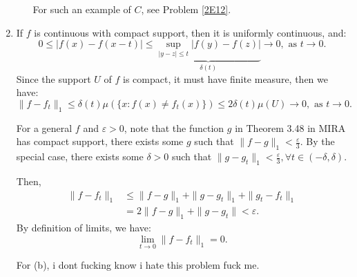 \begin{enumerate}[label=\textbf{3B.\arabic*}]
\begin{enumerate}[label=(\alph*)]
  For such an example of \( C \), see Problem \ref{2E12}.
\end{enumerate}
\item 
  If \( f \) is continuous with compact support, then it is uniformly
  continuous, and:
  \[
    0 \le |f(x)-f(x-t)| \le \underbrace{\sup _{|y-z| \le t}
    |f(y)-f(z)|}_{\delta(t)} \to 0, \text{ as } t \to 0
  .\] 
  Since the support \( U \) of \( f \) is compact, it must have finite measure,
  then we have:
  \[
    \|f-f_{t}\|_{1} \le \delta(t)\mu(\{x: f(x) \neq f_{t}(x)\}  ) \le
    2\delta(t)\mu (U) \to 0, \text{ as } t\to 0
  .\] 

  For a general \( f \) and \( \varepsilon > 0 \), note that the function \( g
  \) in Theorem 3.48 in MIRA has compact support, there exists some \( g \) such
  that \( \|f-g\|_{1} < \frac{\varepsilon}{3} \). By the special case, there
  exists some \( \delta > 0 \) such that \( \|g - g_{t}\|_{1} <
  \frac{\varepsilon}{3}, \forall t \in (-\delta, \delta) \).

  Then,
  \begin{align*}
    \|f-f_{t}\|_{1} &\le \|f - g\|_{1} + \|g -
    g_{t}\|_{1} + \|g_{t}-f_{t}\|_{1}\\
    &= 2\|f-g\|_{1} + \|g-g_{t}\| < \varepsilon
  .\end{align*}
  By definition of limits, we have:
  \[
    \lim_{t \to  0} \|f-f_{t}\|_{1}= 0
  .\]

  For (b), i dont fucking know i hate this problem fuck me.
\end{enumerate}


